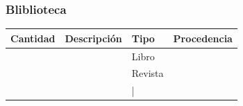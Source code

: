 \documentclass[a4paper,11pt]{article}                 %
\begin{document}
  \subsubsection{Bliblioteca}
    \begin{table}[H]
    \centering
    \begin{tabular}{|c|l|l|l|}
    \hline
    Cantidad & Descripción & Tipo & Procedencia \\ \hline
             &             & Libro   &              \\ \hline
             &             & Revista &              \\ \hline
             &             &        |&              \\ \hline
    \end{tabular}
    \end{table}
\end{document}

